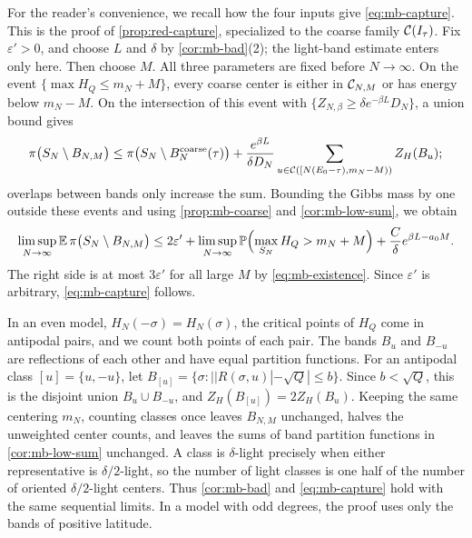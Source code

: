 \begin{remark}\label{rem:mb-assembly}
For the reader's convenience, we recall how the four inputs give \eqref{eq:mb-capture}. This is the proof of \cref{prop:red-capture}, specialized to the coarse family $\mathcal C(I_\tau)$. Fix $\varepsilon'>0$, and choose $L$ and $\delta$ by \cref{cor:mb-bad}(2); the light-band estimate enters only here. Then choose $M$. All three parameters are fixed before $N\to\infty$. On the event $\{\max H_Q\le m_N+M\}$, every coarse center is either in $\mathcal C_{N,M}$ or has energy below $m_N-M$. On the intersection of this event with $\{Z_{N,\beta}\ge\delta e^{-\beta L}D_N\}$, a union bound gives
\[
\pi\bigl(S_N\setminus B_{N,M}\bigr)\le\pi\bigl(S_N\setminus B^{\mathrm{coarse}}_N(\tau)\bigr)+\frac{e^{\beta L}}{\delta D_N}\sum_{u\in\mathcal C([N(E_0-\tau),m_N-M))}Z_H(B_u);
\]
overlaps between bands only increase the sum. Bounding the Gibbs mass by one outside these events and using \cref{prop:mb-coarse} and \cref{cor:mb-low-sum}, we obtain
\[
\limsup_{N\to\infty}\mathbb E\,\pi\bigl(S_N\setminus B_{N,M}\bigr)\le2\varepsilon'+\limsup_{N\to\infty}\mathbb P\Bigl(\max_{S_N}H_Q>m_N+M\Bigr)+\frac{C}{\delta}e^{\beta L-a_0M}.
\]
The right side is at most $3\varepsilon'$ for all large $M$ by \eqref{eq:mb-existence}. Since $\varepsilon'$ is arbitrary, \eqref{eq:mb-capture} follows.
\end{remark}

\begin{remark}\label{rem:mb-even}
In an even model, $H_N(-\sigma)=H_N(\sigma)$, the critical points of $H_Q$ come in antipodal pairs, and we count both points of each pair. The bands $B_u$ and $B_{-u}$ are reflections of each other and have equal partition functions. For an antipodal class $[u]=\{u,-u\}$, let $B_{[u]}=\{\sigma:||R(\sigma,u)|-\sqrt Q|\le b\}$. Since $b<\sqrt Q$, this is the disjoint union $B_u\cup B_{-u}$, and $Z_H(B_{[u]})=2Z_H(B_u)$. Keeping the same centering $m_N$, counting classes once leaves $B_{N,M}$ unchanged, halves the unweighted center counts, and leaves the sums of band partition functions in \cref{cor:mb-low-sum} unchanged. A class is $\delta$-light precisely when either representative is $\delta/2$-light, so the number of light classes is one half of the number of oriented $\delta/2$-light centers. Thus \cref{cor:mb-bad} and \eqref{eq:mb-capture} hold with the same sequential limits. In a model with odd degrees, the proof uses only the bands of positive latitude.
\end{remark}

